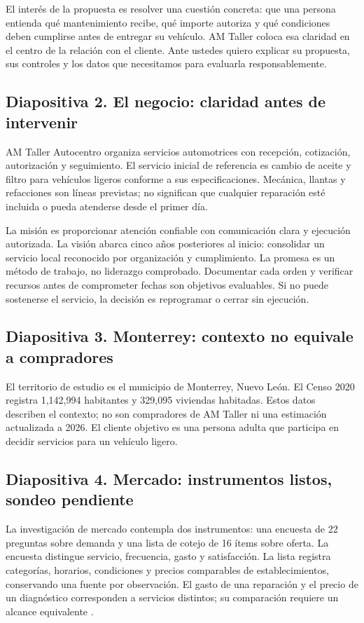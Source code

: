 {El interés de la propuesta es resolver una cuestión concreta: que una persona entienda qué mantenimiento recibe, qué importe autoriza y qué condiciones deben cumplirse antes de entregar su vehículo. AM Taller coloca esa claridad en el centro de la relación con el cliente. Ante ustedes quiero explicar su propuesta, sus controles y los datos que necesitamos para evaluarla responsablemente.

\subsection{Diapositiva 2. El negocio: claridad antes de intervenir}
AM Taller Autocentro organiza servicios automotrices con recepción, cotización, autorización y seguimiento. El servicio inicial de referencia es cambio de aceite y filtro para vehículos ligeros conforme a sus especificaciones. Mecánica, llantas y refacciones son líneas previstas; no significan que cualquier reparación esté incluida o pueda atenderse desde el primer día.

La misión es proporcionar atención confiable con comunicación clara y ejecución autorizada. La visión abarca cinco años posteriores al inicio: consolidar un servicio local reconocido por organización y cumplimiento. La promesa es un método de trabajo, no liderazgo comprobado. Documentar cada orden y verificar recursos antes de comprometer fechas son objetivos evaluables. Si no puede sostenerse el servicio, la decisión es reprogramar o cerrar sin ejecución.

\subsection{Diapositiva 3. Monterrey: contexto no equivale a compradores}
El territorio de estudio es el municipio de Monterrey, Nuevo León. El Censo 2020 registra 1,142,994 habitantes y 329,095 viviendas habitadas. Estos datos describen el contexto; no son compradores de AM Taller ni una estimación actualizada a 2026. El cliente objetivo es una persona adulta que participa en decidir servicios para un vehículo ligero.

\subsection{Diapositiva 4. Mercado: instrumentos listos, sondeo pendiente}
La investigación de mercado contempla dos instrumentos: una encuesta de 22 preguntas sobre demanda y una lista de cotejo de 16 ítems sobre oferta. La encuesta distingue servicio, frecuencia, gasto y satisfacción. La lista registra categorías, horarios, condiciones y precios comparables de establecimientos, conservando una fuente por observación. El gasto de una reparación y el precio de un diagnóstico corresponden a servicios distintos; su comparación requiere un alcance equivalente \citep{albrechtMarketing2023}.

}
